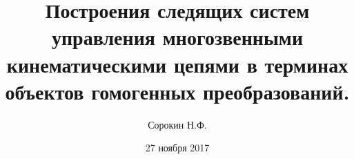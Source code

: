 \documentclass[12pt,a4paper,titlepage]{article}
\begin{document}
\date{27 ноября 2017}

\title{Построения следящих систем управления многозвенными кинематическими цепями в терминах объектов гомогенных преобразований.}
\author{Сорокин Н.Ф.}

\maketitle




























\end{document}
